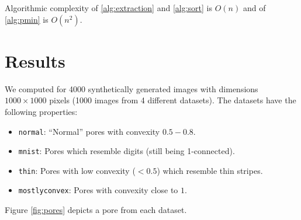 \documentclass[reprint,amsmath,amssymb,aps,pre,showkeys,showpacs]{revtex4-1}
\newcommand{\highlight}[1]{{\color{red}{#1}}} %
\begin{document}
Algorithmic complexity of \ref{alg:extraction} and \ref{alg:sort} is $O(n)$ and
of \ref{alg:pmin} is $O(n^2)$.

\section{Results}
We computed \highlight{awesomeness} for 4000 synthetically generated images with
dimensions $1000 \times 1000$ pixels (1000 images from 4 different
datasets). The datasets have the following properties:
\begin{itemize}
\item \texttt{normal}: ``Normal'' pores with convexity $0.5-0.8$.
\item \texttt{mnist}: Pores which resemble digits (still being 1-connected).
\item \texttt{thin}: Pores with low convexity ($< 0.5$) which resemble thin
  stripes.
\item \texttt{mostlyconvex}: Pores with convexity close to $1$.
\end{itemize}
Figure \ref{fig:pores} depicts a pore from each dataset.
\end{document}
